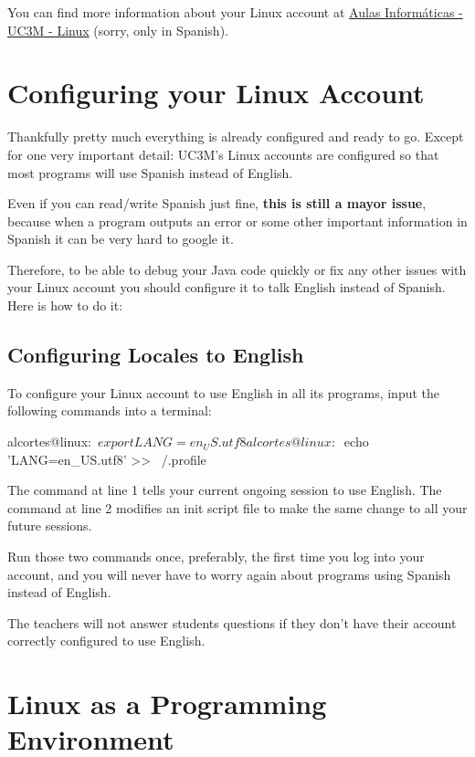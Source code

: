 \documentclass[a4paper, 12pt]{article}
\begin{document}
You can find more information about your Linux account at
\href{http://www.aig.uc3m.es/index.php?option=com_content&task=view&id=28&Itemid=49}{Aulas
Informáticas - UC3M - Linux} (sorry, only in Spanish).


\section{Configuring your Linux Account}

Thankfully pretty much everything is already configured and ready to go.
Except for one very important detail: UC3M's Linux accounts are configured
so that most programs will use Spanish instead of English.

Even if you can read/write Spanish just fine, \textbf{this is still a mayor
issue}, because when a program outputs an error or some other important
information in Spanish it can be very hard to google it.

Therefore, to be able to debug your Java code quickly or fix any other issues
with your Linux account you should configure it to talk English instead of
Spanish. Here is how to do it:

\subsection{Configuring Locales to English}

To configure your Linux account to use English in all its programs, input the
following commands into a terminal:

\begin{blackboard}
alcortes@linux:~$ export LANG=en_US.utf8
alcortes@linux:~$ echo 'LANG=en_US.utf8' >> ~/.profile
\end{blackboard}

The command at line 1 tells your current ongoing session to use English. The
command at line 2 modifies an init script file to make the same change to all
your future sessions.

Run those two commands once, preferably, the first time you log into your
account, and you will never have to worry again about programs using Spanish
instead of English.

The teachers will not answer students questions if they don't have their
account correctly configured to use English.

\section{Linux as a Programming Environment}
\end{document}
